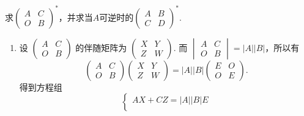 \begin{exercise}
\begin{exgroup}
\begin{answer}
        \end{answer}

        \item 求$\begin{pmatrix}
                A & C \\ O & B
            \end{pmatrix}^*$，并求当$A$可逆时的$\begin{pmatrix}
                A & B \\ C & D
            \end{pmatrix}^*$.
        \begin{answer}
            \begin{enumerate}
                \item 设 $\begin{pmatrix}
                              A & C \\
                              O & B
                          \end{pmatrix}$ 的伴随矩阵为 $\begin{pmatrix}
                              X & Y \\
                              Z & W
                          \end{pmatrix}$. 而 $\begin{vmatrix}
                              A & C \\
                              O & B
                          \end{vmatrix} = \lvert A\rvert \lvert B \rvert$，所以有
                      \[\begin{pmatrix}
                              A & C \\
                              O & B
                          \end{pmatrix} \begin{pmatrix}
                              X & Y \\
                              Z & W
                          \end{pmatrix} = \lvert A\rvert \lvert B \rvert \begin{pmatrix}
                              E & O \\
                              O & E
                          \end{pmatrix}.\]
                      得到方程组
                      \[\begin{cases}
                              AX+CZ = \lvert A \rvert \lvert B \rvert E \\

\end{cases}\]
\end{enumerate}
\end{answer}
\end{exgroup}
\end{exercise}
